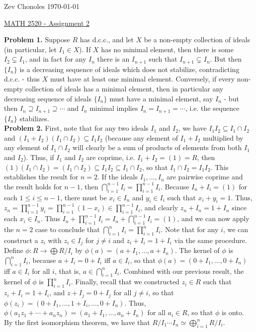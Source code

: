 \documentclass[11pt]{article}
\newcommand{\num}[1]{\noindent \textbf{#1}}
\theoremstyle{definition}
\begin{document}
\noindent Zev Chonoles \hfill \today\\[-0.4in]
\begin{center}
\noindent \underline{MATH 2520 - Assignment 2}
\end{center}

\num{Problem 1.} Suppose $R$ has d.c.c., and let $X$ be a non-empty collection
of ideals (in particular, let $I_1\in X$). If $X$ has no minimal element,
then there is some $I_2\subsetneq I_1$, and in fact for any $I_n$ there
is an $I_{n+1}$ such that $I_{n+1}\subsetneq I_n$. But then $\{I_n\}$
is a decreasing sequence of ideals which does not stabilize, contradicting
d.c.c. - thus $X$ must have at least one minimal element. Conversely, if every
non-empty collection of ideals has a minimal element, then in particular
any decreasing sequence of ideals $\{I_n\}$ must have a minimal element,
say $I_n$ - but then $I_n\supseteq I_{n+1}\supseteq \cdots$ and $I_n$ minimal
implies $I_n=I_{n+1}=\cdots$, i.e. the sequence $\{I_n\}$ stabilizes.    \\

\num{Problem 2.} First, note that for any two ideals $I_1$ and $I_2$, we
have $I_1I_2\subseteq I_1\cap I_2$ and $(I_1+I_2)(I_1\cap I_2)\subseteq
I_1I_2$ (because any element of $I_1+I_2$ multiplied by any element of
$I_1\cap I_2$ will clearly be a sum of products of elements from both $I_1$
and $I_2$). Thus, if $I_1$ and $I_2$ are coprime, i.e. $I_1+I_2=(1)=R$,
then $(1)(I_1\cap I_2)=(I_1\cap I_2)\subseteq I_1I_2\subseteq I_1\cap I_2$,
so that $I_1\cap I_2=I_1I_2$. This establishes the result for $n=2$. If the
ideals $I_1,\ldots,I_n$ are pairwise coprime and the result holds for $n-1$,
then $\bigcap_{i=1}^{n-1} I_i=\prod_{i=1}^{n-1}I_i$.  Because $I_n+I_i=(1)$
for each $1\leq i\leq n-1$, there must be $x_i\in I_n$ and $y_i\in I_i$ such
that $x_i+y_i=1$. Thus, $z_n=\prod_{i=1}^{n-1}y_i=\prod_{i=1}^{n-1}(1-x_i)\in
\prod_{i=1}^{n-1} I_i$, and clearly $z_n+I_n=1+I_n$ since each $x_i\in
I_n$. Thus $I_n+\prod_{i=1}^{n-1}I_i=I_n+\bigcap_{i=1}^{n-1}I_i=(1)$,
and we can now apply the $n=2$ case to conclude that $\bigcap_{i=1}^n
I_i=\prod_{i=1}^n I_i$. Note that for any $i$, we can construct a $z_i$
with $z_i\in I_j$ for $j\neq i$ and $z_i+I_i=1+I_i$ via the same procedure.\\

\noindent Define $\phi:R\rightarrow\bigoplus R/I_i$
by $\phi(a)=(a+I_1,\ldots,a+I_n)$. The kernel of $\phi$ is
$\bigcap_{i=1}^n I_i$, because $a+I_i=0+I_i$ iff $a\in I_i$, so that
$\phi(a)=(0+I_1,\ldots,0+I_n)$ iff $a\in I_i$ for all $i$, that is,
$a\in\bigcap_{i=1}^n I_i$. Combined with our previous result, the kernel
of $\phi$ is $\prod_{i=1}^n I_i$. Finally, recall that we constructed
$z_i\in R$ such that $z_i+I_i=1+I_i$, and $z+I_j=0+I_j$ for all $j\neq
i$, so that $\phi(z_i)=(0+I_1,\ldots,1+I_{i},\ldots,0+I_n)$. Thus,
$\phi(a_1z_1+\cdots+a_nz_n)=(a_1+I_1,\ldots,a_n+I_n)$ for all $a_i\in R$,
so that $\phi$ is onto. By the first isomorphism theorem, we have that
$R/I_1\cdots I_n\simeq \bigoplus_{i=1}^nR/I_i$.   \\
\end{document}
